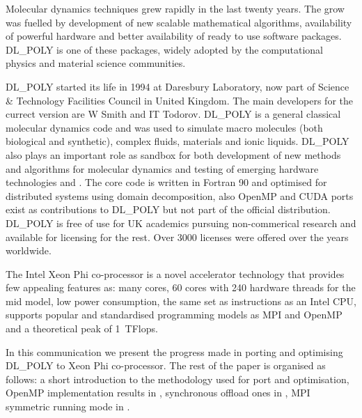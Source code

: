 \par{Molecular dynamics techniques grew rapidly in the last twenty years. 
The grow was fuelled by development of new scalable mathematical algorithms, availability 
of powerful hardware and better availability of ready to use software packages. DL\_POLY is one of 
these packages, widely adopted by the computational physics and material science communities.}
\par{DL\_POLY started its life in 1994 at Daresbury Laboratory, now part of Science \& Technology Facilities 
Council in United Kingdom. The main developers for the currect version are W Smith and IT Todorov. DL\_POLY is 
a general classical molecular dynamics code and was used to simulate macro molecules (both biological and synthetic),
complex fluids, materials and ionic liquids. DL\_POLY also plays an important role as sandbox for both development
of new methods and algorithms for molecular dynamics and testing of emerging hardware 
technologies\cite{dlpoly} and \cite{Todorov2006}.
The core code is written in Fortran 90 and optimised for distributed systems using domain decomposition, also OpenMP and CUDA ports exist as 
contributions to DL\_POLY but not part of the official distribution.
DL\_POLY is free of use for UK academics pursuing non-commerical research and available for licensing for the rest.
Over 3000 licenses were offered over the years worldwide.
}
\par{The Intel Xeon Phi co-processor is a novel accelerator technology that provides few appealing features as:
many cores, 60 cores with 240 hardware threads for the mid model, low power consumption, the same set as 
instructions as an Intel CPU, supports popular and standardised programming models as MPI and OpenMP and a 
theoretical peak of 1~TFlops.}
\par{In this communication we present the progress made in porting and optimising DL\_POLY to Xeon Phi co-processor. 
The rest of the paper is organised as follows: a short introduction to the methodology used for port and optimisation,
OpenMP implementation results in , synchronous offload ones in , MPI symmetric
 running mode in .}
